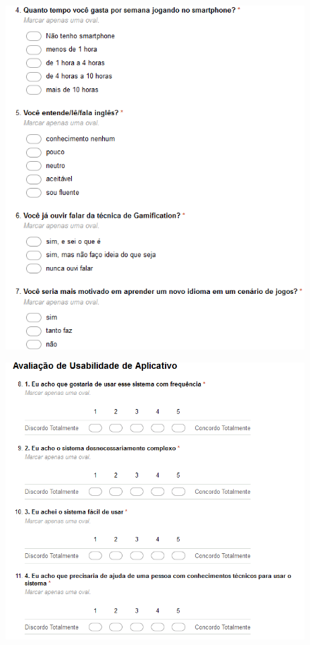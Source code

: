 \documentclass[
	12pt,				%
	openany,			%
	oneside,			%
	a4paper,			%
	english,			%
	french,				%
	spanish,			%
	brazil				%
	]{abntex2}
\begin{document}
\begin{apendicesenv}
\begin{figure}[H]
\end{figure}

\begin{figure}[H]
    \centering

\includegraphics[width=17cm]{figuras/2.png}
\par

\end{figure}

\begin{figure}[H]
    \centering

\includegraphics[width=17cm]{figuras/3.png}
\par


\end{figure}
\end{apendicesenv}
\end{document}
